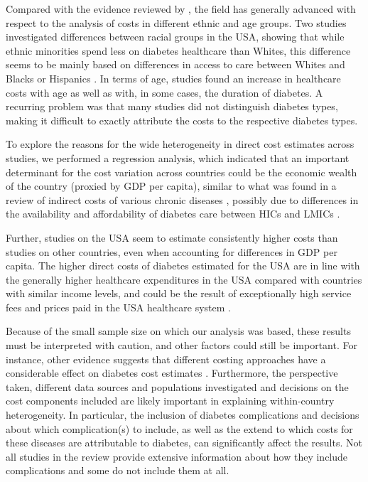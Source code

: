 Compared with the evidence reviewed by \textcite{Ettaro2004}, the field has generally advanced with respect to the analysis of costs in different ethnic and age groups. Two studies investigated differences between racial groups in the USA, showing that while ethnic minorities spend less on diabetes healthcare than Whites, this difference seems to be mainly based on differences in access to care between Whites and Blacks or Hispanics \parencite{Lee2006,Buescher2010}. In terms of age, studies found an increase in healthcare costs with age as well as with, in some cases, the duration of diabetes. A recurring problem was that many studies did not distinguish diabetes types, making it difficult to exactly attribute the costs to the respective diabetes types.

To explore the reasons for the wide heterogeneity in direct cost estimates across studies, we performed a regression analysis, which indicated that an important determinant for the cost variation across countries could be the economic wealth of the country (proxied by \ac{GDP} per capita), similar to what was found in a review of indirect costs of various chronic diseases \parencite{Zhao2013}, possibly due to differences in the availability and affordability of diabetes care between \acp{HIC} and \acp{LMIC}  \parencite{Cameron2009g,Cameron2011b}. 

Further, studies on the USA seem to estimate consistently higher costs than studies on other countries, even when accounting for differences in \ac{GDP} per capita. The higher direct costs of diabetes estimated for the USA are in line with the generally higher healthcare expenditures in the USA compared with countries with similar income levels, and could be the result of exceptionally high service fees \parencite{Laugesen2011} and prices paid in the USA healthcare system \parencite{Squires2012,Lorenzoni2014}.

Because of the small sample size on which our analysis was based, these results must be interpreted with caution, and other factors could still be important. For instance, other evidence suggests that different costing approaches have a considerable effect on diabetes cost estimates \parencite{Tunceli2010c,Honeycutt2009a}. Furthermore, the perspective taken, different data sources and populations investigated and decisions on the cost components included are likely important in explaining within-country heterogeneity. In particular, the inclusion of diabetes complications and decisions about which complication(s) to include, as well as the extend to which costs for these diseases are attributable to diabetes, can significantly affect the results. Not all studies in the review provide extensive information about how they include complications and some do not include them at all.

